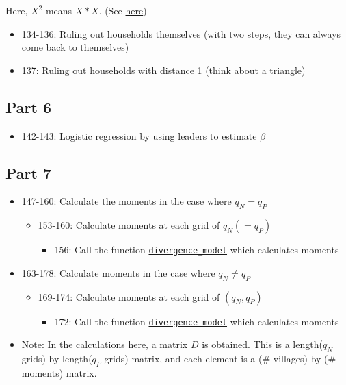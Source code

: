 \documentclass[10pt,letterpaper]{article}
\begin{document}
\begin{itemize}
\begin{itemize}
        Here, $X^2$ means $X * X$.
        (See \href{https://en.wikipedia.org/wiki/Adjacency_matrix#Matrix_powers}{here})
        \begin{itemize}
          \item 134-136: Ruling out households themselves (with two steps, they can always come back to themselves)
          \item 137: Ruling out households with distance 1 (think about a triangle)
        \end{itemize}
    \end{itemize}
\end{itemize}

\subsection*{Part 6}
\begin{itemize}
  \item 142-143: Logistic regression by using leaders to estimate $\beta$
\end{itemize}

\subsection*{Part 7}
\begin{itemize}
  \item 147-160: Calculate the moments in the case where $q_N = q_P$
    \begin{itemize}
      \item 153-160: Calculate moments at each grid of $q_N (= q_P)$
        \begin{itemize}
          \item 156: Call the function \hyperref[divergence_model]{\texttt{divergence\_model}} which calculates moments
        \end{itemize}
    \end{itemize}
  \item 163-178: Calculate moments in the case where $q_N \ne q_P$
    \begin{itemize}
      \item 169-174: Calculate moments at each grid of $(q_N, q_P)$
        \begin{itemize}
          \item 172: Call the function \hyperref[divergence_model]{\texttt{divergence\_model}} which calculates moments
        \end{itemize}
    \end{itemize}
  \item Note: In the calculations here, a matrix $D$ is obtained.
    This is a length($q_N$ grids)-by-length($q_P$ grids) matrix, and each element is a (\# villages)-by-(\# moments) matrix.
\end{itemize}
\end{document}

